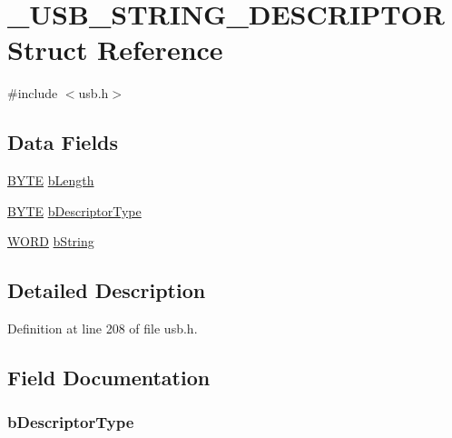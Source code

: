 \hypertarget{struct___u_s_b___s_t_r_i_n_g___d_e_s_c_r_i_p_t_o_r}{
\section{\_\-USB\_\-STRING\_\-DESCRIPTOR Struct Reference}
\label{struct___u_s_b___s_t_r_i_n_g___d_e_s_c_r_i_p_t_o_r}
}


{\ttfamily \#include $<$usb.h$>$}

\subsection*{Data Fields}
\begin{DoxyCompactItemize}
\item 
\hyperlink{type_8h_a4ae1dab0fb4b072a66584546209e7d58}{BYTE} \hyperlink{struct___u_s_b___s_t_r_i_n_g___d_e_s_c_r_i_p_t_o_r_a8e443464272fdf3bd5148df0b7f5dcaf}{bLength}
\item 
\hyperlink{type_8h_a4ae1dab0fb4b072a66584546209e7d58}{BYTE} \hyperlink{struct___u_s_b___s_t_r_i_n_g___d_e_s_c_r_i_p_t_o_r_ac1d02ce6fe165032044fb81602a9b07c}{bDescriptorType}
\item 
\hyperlink{type_8h_a197942eefa7db30960ae396d68339b97}{WORD} \hyperlink{struct___u_s_b___s_t_r_i_n_g___d_e_s_c_r_i_p_t_o_r_a95218d59dc2cad19d16fa6f721222be9}{bString}
\end{DoxyCompactItemize}


\subsection{Detailed Description}


Definition at line 208 of file usb.h.



\subsection{Field Documentation}
\hypertarget{struct___u_s_b___s_t_r_i_n_g___d_e_s_c_r_i_p_t_o_r_ac1d02ce6fe165032044fb81602a9b07c}{
\subsubsection[{bDescriptorType}]{ {\bf bDescriptorType}}}
\label{struct___u_s_b___s_t_r_i_n_g___d_e_s_c_r_i_p_t_o_r_ac1d02ce6fe165032044fb81602a9b07c}


